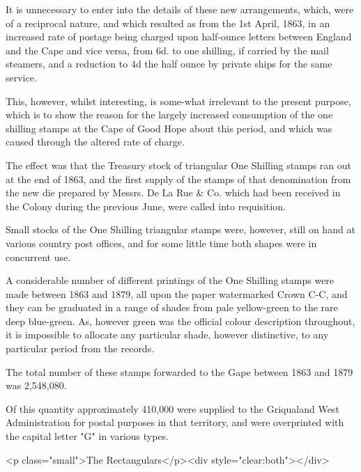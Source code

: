 It is unnecessary to enter into the details of these new arrangements, 
which, were of a reciprocal nature, and which resulted as from the 
1st April, 1863, in an increased rate of postage being charged 
upon half-ounce letters between England and the Cape and vice 
versa, from 6d. to one shilling, if carried by the mail steamers, 
and a reduction to 4d the half ounce by private ships for the same service.

This, however, whilst interesting, is some-what irrelevant to the 
present purpose, which is to show the reason for the largely 
increased consumption of the one shilling stamps at the Cape of Good 
Hope about this period, and which was caused through the 
altered rate of charge.


The effect was that the Treasury stock of triangular One Shilling stamps
ran out at the end of 1863, and the first supply of the stamps of 
that denomination from the new die prepared by Messrs. De La Rue \& Co. 
which had been received in the Colony during the previous June, 
were called into requisition.


Small stocks of the One Shilling triangular stamps were, however, 
still on hand at various country post offices, and for some little 
time both shapes were in concurrent use.

A considerable number of different printings of the One Shilling 
stamps were made between 1863 and 1879, all upon the paper 
watermarked Crown C-C, and they can be graduated in a range of 
shades from pale yellow-green to the rare deep blue-green. As, 
however green  was the official colour description throughout, it 
is impossible to allocate any particular shade, however distinctive, 
to any particular period from the records.

The total number of these stamps forwarded to the Gape between 
1863 and 1879 was 2,548,080.


Of this quantity approximately 410,000 were supplied to 
the Griqualand West Administration for postal purposes in that 
territory, and were overprinted with the capital letter "G" in various types.


<p class="small">The Rectangulars</p><div style="clear:both"></div>



